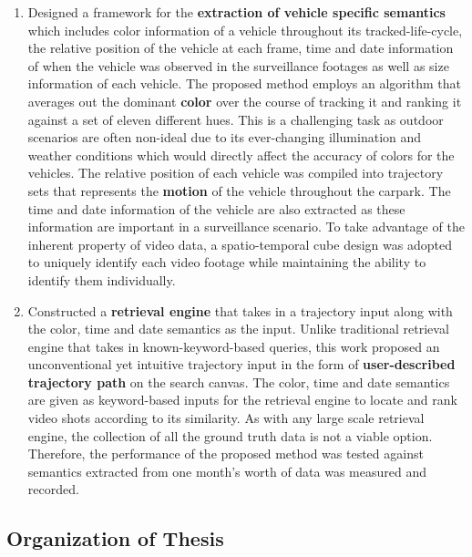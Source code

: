 \begin{enumerate}  
\item Designed a framework for the \textbf{extraction of vehicle specific semantics} which includes color information of a vehicle throughout its tracked-life-cycle, the relative position of the vehicle at each frame, time and date information of when the vehicle was observed in the surveillance footages as well as size information of each vehicle. The proposed method employs an algorithm that averages out the dominant \textbf{color} over the course of tracking it and ranking it against a set of eleven different hues. This is a challenging task as outdoor scenarios are often non-ideal due to its ever-changing illumination and weather conditions which would directly affect the accuracy of colors for the vehicles. The relative position of each vehicle was compiled into trajectory sets that represents the \textbf{motion} of the vehicle throughout the carpark. The time and date information of the vehicle are also extracted as these information are important in a surveillance scenario. To take advantage of the inherent property of video data, a spatio-temporal cube design was adopted to uniquely identify each video footage while maintaining the ability to identify them individually.  
\item Constructed a \textbf{retrieval engine} that takes in a trajectory input along with the color, time and date semantics as the input. Unlike traditional retrieval engine that takes in known-keyword-based queries, this work proposed an unconventional yet intuitive trajectory input in the form of \textbf{user-described trajectory path} on the search canvas. The color, time and date semantics are given as keyword-based inputs for the retrieval engine to locate and rank video shots according to its similarity. As with any large scale retrieval engine, the collection of all the ground truth data is not a viable option. Therefore, the performance of the proposed method was tested against semantics extracted from one month's worth of data was measured and recorded. 
\end{enumerate}



\subsection{Organization of Thesis}

